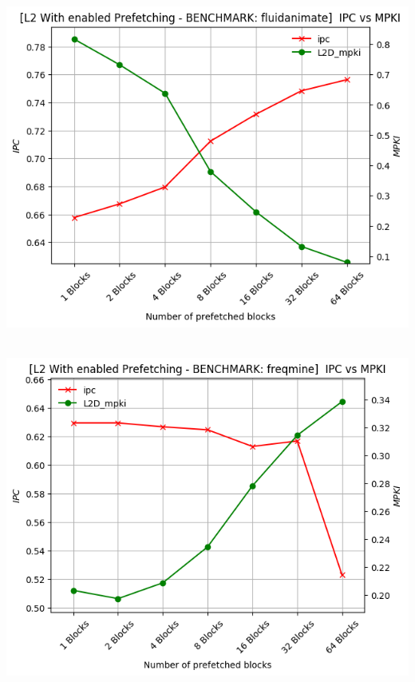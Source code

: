 \begin{minipage}{\textwidth}
    \begin{center}
        \\
        \vspace{3mm}
        \includegraphics[scale=0.70]{graphs/PREF/fluidanimate.png}
        \vspace{6mm}
    \end{center}
\end{minipage}

\begin{minipage}{\textwidth}
    \begin{center}
        \\
        \vspace{3mm}
        \includegraphics[scale=0.70]{graphs/PREF/freqmine.png}
        \vspace{6mm}
    \end{center}
\end{minipage}

